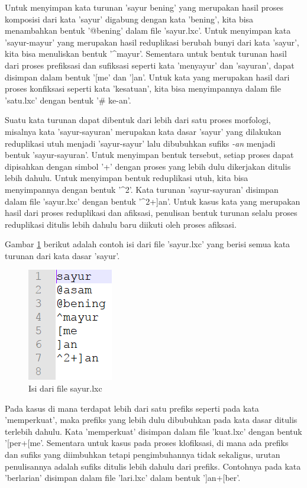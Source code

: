 Untuk menyimpan kata turunan 'sayur bening' yang merupakan hasil proses komposisi dari kata 'sayur' digabung dengan kata 'bening', kita bisa menambahkan bentuk '@bening' dalam file 'sayur.lxc'. Untuk menyimpan kata 'sayur-mayur' yang merupakan hasil reduplikasi berubah bunyi dari kata 'sayur', kita bisa menuliskan bentuk '\textasciicircum mayur'. Sementara untuk bentuk turunan hasil dari proses prefiksasi dan sufiksasi seperti kata 'menyayur' dan 'sayuran', dapat disimpan dalam bentuk '[me' dan ']an'. Untuk kata yang merupakan hasil dari proses konfiksasi seperti kata 'kesatuan', kita bisa menyimpannya dalam file 'satu.lxc' dengan bentuk '\# ke-an'.

Suatu kata turunan dapat dibentuk dari lebih dari satu proses morfologi, misalnya kata 'sayur-sayuran' merupakan kata dasar 'sayur' yang dilakukan reduplikasi utuh menjadi 'sayur-sayur' lalu dibubuhkan sufiks \textit{-an} menjadi bentuk 'sayur-sayuran'. Untuk menyimpan bentuk tersebut, setiap proses dapat dipisahkan dengan simbol '+' dengan proses yang lebih dulu dikerjakan ditulis lebih dahulu. Untuk menyimpan bentuk reduplikasi utuh, kita bisa menyimpannya dengan bentuk '\textasciicircum 2'. Kata turunan 'sayur-sayuran' disimpan dalam file 'sayur.lxc' dengan bentuk '\textasciicircum 2+]an'. Untuk kasus kata yang merupakan hasil dari proses reduplikasi dan afiksasi, penulisan bentuk turunan selalu proses reduplikasi ditulis lebih dahulu baru diikuti oleh proses afiksasi. 

Gambar \ref{contoh-entri-sayur} berikut adalah contoh isi dari file 'sayur.lxc' yang berisi semua kata turunan dari kata dasar 'sayur'.

\begin{figure}[H]
\centering
\includegraphics[scale=1]{Gambar/contoh-entri-sayur}
\caption{Isi dari file sayur.lxc} 
\label{contoh-entri-sayur}
\end{figure}

Pada kasus di mana terdapat lebih dari satu prefiks seperti pada kata 'memperkuat', maka prefiks yang lebih dulu dibubuhkan pada kata dasar ditulis terlebih dahulu. Kata 'memperkuat' disimpan dalam file 'kuat.lxc' dengan bentuk '[per+[me'. Sementara untuk kasus pada proses klofiksasi, di mana ada prefiks dan sufiks yang diimbuhkan tetapi pengimbuhannya tidak sekaligus, urutan penulisannya adalah sufiks ditulis lebih dahulu dari prefiks. Contohnya pada kata 'berlarian' disimpan dalam file 'lari.lxc' dalam bentuk ']an+[ber'.


